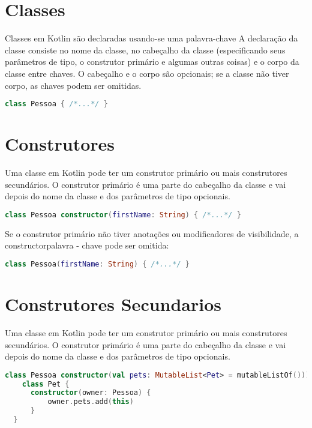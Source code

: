 
\section{Classes}
Classes em Kotlin são declaradas usando-se uma palavra-chave
A declaração da classe consiste no nome da classe, no cabeçalho da
classe (especificando seus parâmetros de tipo, o construtor
primário e algumas outras coisas) e o corpo da classe entre
chaves. O cabeçalho e o corpo são opcionais; se a classe não tiver corpo, as chaves podem ser omitidas.
\begin{lstlisting}[label={lst:example1}, language=Kotlin]
      class Pessoa { /*...*/ }
      \end{lstlisting}


\section{Construtores}
Uma classe em Kotlin pode ter um construtor primário ou mais
construtores secundários. O construtor primário é uma parte do
cabeçalho da classe e vai depois do nome da classe e dos parâmetros
de tipo opcionais.
\begin{lstlisting}[label={lst:example1}, language=Kotlin]
  class Pessoa constructor(firstName: String) { /*...*/ }
      \end{lstlisting}

Se o construtor primário não tiver anotações ou modificadores 
de visibilidade, a constructorpalavra - chave pode ser omitida:
\begin{lstlisting}[label={lst:example1}, language=Kotlin]
  class Pessoa(firstName: String) { /*...*/ }
      \end{lstlisting}


\section{Construtores Secundarios}
Uma classe em Kotlin pode ter um construtor primário ou mais
construtores secundários. O construtor primário é uma parte do
cabeçalho da classe e vai depois do nome da classe e dos parâmetros
de tipo opcionais.
\begin{lstlisting}[label={lst:example1}, language=Kotlin]
  class Pessoa constructor(val pets: MutableList<Pet> = mutableListOf())) {
    class Pet {
      constructor(owner: Pessoa) {
          owner.pets.add(this) 
      }
  }
      \end{lstlisting}

